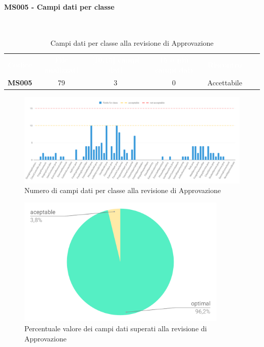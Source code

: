 \paragraph{MS005 - Campi dati per classe}\mbox{}\\[0,3cm]
    \begin{table}[H]
        \centering
        \begin{tabular}{ccccccc}
            \rowcolor{greySWEight}
            \textcolor{white}{\textbf{Codice}} &
            \textcolor{white}{\textbf{File analizzati}}&
            \textcolor{white}{\textbf{[10,15] campi dati}}&
            \textcolor{white}{\textbf{15 o più campi dati}}&
            \textcolor{white}{\textbf{Riscontro}}\\
            \textbf{MS005} & 79 & 3 & 0 & \textcolor{YellowOrange}{Accettabile}\\
        \end{tabular}
        \caption{Campi dati per classe alla revisione di Approvazione}
    \end{table}
    \begin{figure}[H]
        \centering
        \includegraphics[width=165mm]{sez/App_Esito/Approvazione/graph/campiDati.pdf}
        \caption{Numero di campi dati per classe alla revisione di Approvazione}
    \end{figure}
    \begin{figure}[H]
        \centering
        \includegraphics[width=100mm]{sez/App_Esito/Approvazione/graph/campiDatoTorta.pdf}
        \caption{Percentuale valore dei campi dati superati alla revisione di Approvazione}
    \end{figure}

